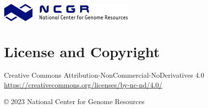 \documentclass[
]{book}
\begin{document}
\includegraphics[width=0.5\textwidth,height=\textheight]{./Figures/ncgr.png}

\hypertarget{license-and-copyright-1}{%
\chapter{License and Copyright}\label{license-and-copyright-1}}

Creative Commons Attribution-NonCommercial-NoDerivatives 4.0
\url{https://creativecommons.org/licenses/by-nc-nd/4.0/}

© 2023 National Center for Genome Resources

  
\end{document}
